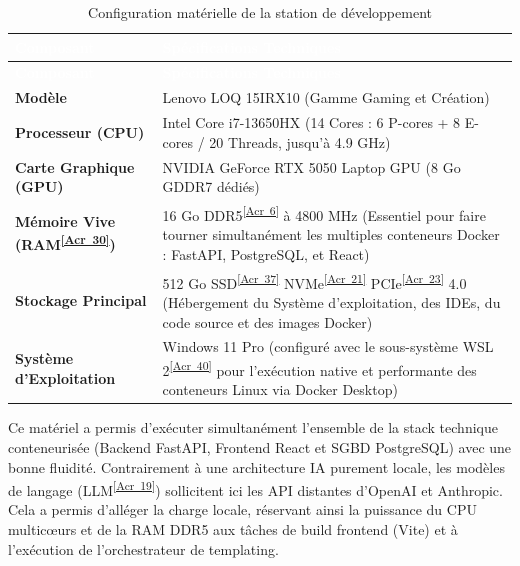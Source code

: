 \documentclass[12pt, a4paper]{report}
\newcommand{\acref}[1]{\textsuperscript{\hyperlink{acr:#1}{[Acr~#1]}}}
\begin{document}
\begin{longtable}{|p{4.5cm}|p{\dimexpr\textwidth-5.1cm}|}
    \hline
    \rowcolor{ChapColor}
    \textcolor{white}{\textbf{Composant}} & \textcolor{white}{\textbf{Spécifications Techniques}} \\ \hline
    \endfirsthead

    \hline
    \rowcolor{ChapColor}
    \textcolor{white}{\textbf{Composant}} & \textcolor{white}{\textbf{Spécifications Techniques}} \\ \hline
    \endhead

    \hline
    \endfoot

    \hline
    \caption{Configuration matérielle de la station de développement} 
    \label{tab:hardware_specs}
    \endlastfoot

    \textbf{Modèle} & Lenovo LOQ 15IRX10 (Gamme Gaming et Création) \\ \hline
    
    \textbf{Processeur (CPU)} & Intel Core i7-13650HX (14 Cores : 6 P-cores + 8 E-cores / 20 Threads, jusqu'à 4.9 GHz) \\ \hline
    
    \textbf{Carte Graphique (GPU)} & NVIDIA GeForce RTX 5050 Laptop GPU (8 Go GDDR7 dédiés) \\ \hline
    
    \textbf{Mémoire Vive (RAM\acref{30})} & 16 Go DDR5\acref{6} à 4800 MHz (Essentiel pour faire tourner simultanément les multiples conteneurs Docker : FastAPI, PostgreSQL, et React) \\ \hline
    
    \textbf{Stockage Principal} & 512 Go SSD\acref{37} NVMe\acref{21} PCIe\acref{23} 4.0 (Hébergement du Système d'exploitation, des IDEs, du code source et des images Docker) \\ \hline
    
    \textbf{Système d'Exploitation} & Windows 11 Pro (configuré avec le sous-système WSL 2\acref{40} pour l'exécution native et performante des conteneurs Linux via Docker Desktop) \\ 
\end{longtable}

Ce matériel a permis d'exécuter simultanément l'ensemble de la stack technique conteneurisée (Backend FastAPI, Frontend React et SGBD PostgreSQL) avec une bonne fluidité. Contrairement à une architecture IA purement locale, les modèles de langage (LLM\acref{19}) sollicitent ici les API distantes d'OpenAI et Anthropic. Cela a permis d'alléger la charge locale, réservant ainsi la puissance du CPU multicœurs et de la RAM DDR5 aux tâches de build frontend (Vite) et à l'exécution de l'orchestrateur de templating.
\end{document}
